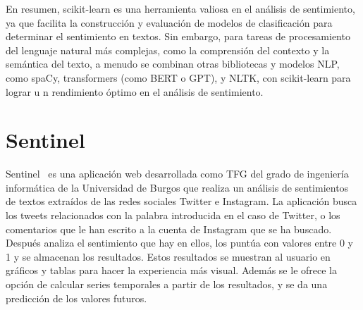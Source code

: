 En resumen, scikit-learn es una herramienta valiosa en el análisis de sentimiento, 
ya que facilita la construcción y evaluación de modelos de clasificación 
para determinar el sentimiento en textos. 
Sin embargo, para tareas de procesamiento del lenguaje natural 
más complejas, como la comprensión del contexto y la semántica del texto, 
a menudo se combinan otras bibliotecas y modelos NLP, como spaCy, 
transformers (como BERT o GPT), y NLTK, con scikit-learn para lograr u
n rendimiento óptimo en el análisis de sentimiento.


\section{Sentinel}
Sentinel~\cite{Sentinel1} es una aplicación web desarrollada como TFG del grado de ingeniería 
informática de la Universidad de Burgos que realiza un análisis de sentimientos de textos 
extraídos de las redes sociales Twitter e Instagram.
La aplicación busca los tweets relacionados con la palabra introducida 
en el caso de Twitter, o los comentarios que le han escrito a la 
cuenta de Instagram que se ha buscado.
Después analiza el sentimiento que hay en ellos, los puntúa con valores entre 0 y 1 y 
se almacenan los resultados.
Estos resultados se muestran al usuario en gráficos 
y tablas para hacer la experiencia más visual. 
Además se le ofrece la opción de calcular series temporales a partir de los resultados, 
y se da una predicción de los valores futuros.


